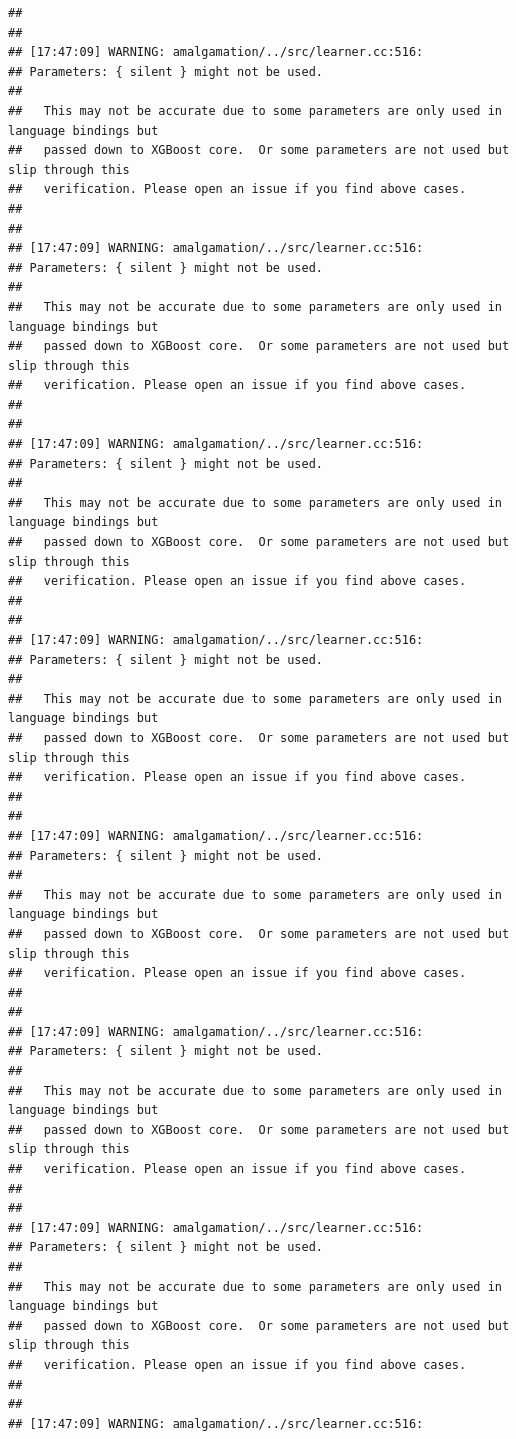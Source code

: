 \documentclass[AMS,STIX2COL]{WileyNJD-v2}\usepackage[]{graphicx}\usepackage[]{color}
\makeatletter
\newenvironment{kframe}{%
 \def\at@end@of@kframe{}%
 \ifinner\ifhmode%
  \def\at@end@of@kframe{\end{minipage}}%
  \begin{minipage}{\columnwidth}%
 \fi\fi%
 \def\FrameCommand##1{\hskip\@totalleftmargin \hskip-\fboxsep
 \colorbox{shadecolor}{##1}\hskip-\fboxsep
     \hskip-\linewidth \hskip-\@totalleftmargin \hskip\columnwidth}%
 \MakeFramed {\advance\hsize-\width
   \@totalleftmargin\z@ \linewidth\hsize
   \@setminipage}}%
 {\par\unskip\endMakeFramed%
 \at@end@of@kframe}
\newenvironment{knitrout}{}{} %
\makeatother
\begin{document}
\begin{knitrout}
\begin{kframe}
\begin{verbatim}
## 
## 
## [17:47:09] WARNING: amalgamation/../src/learner.cc:516: 
## Parameters: { silent } might not be used.
## 
##   This may not be accurate due to some parameters are only used in language bindings but
##   passed down to XGBoost core.  Or some parameters are not used but slip through this
##   verification. Please open an issue if you find above cases.
## 
## 
## [17:47:09] WARNING: amalgamation/../src/learner.cc:516: 
## Parameters: { silent } might not be used.
## 
##   This may not be accurate due to some parameters are only used in language bindings but
##   passed down to XGBoost core.  Or some parameters are not used but slip through this
##   verification. Please open an issue if you find above cases.
## 
## 
## [17:47:09] WARNING: amalgamation/../src/learner.cc:516: 
## Parameters: { silent } might not be used.
## 
##   This may not be accurate due to some parameters are only used in language bindings but
##   passed down to XGBoost core.  Or some parameters are not used but slip through this
##   verification. Please open an issue if you find above cases.
## 
## 
## [17:47:09] WARNING: amalgamation/../src/learner.cc:516: 
## Parameters: { silent } might not be used.
## 
##   This may not be accurate due to some parameters are only used in language bindings but
##   passed down to XGBoost core.  Or some parameters are not used but slip through this
##   verification. Please open an issue if you find above cases.
## 
## 
## [17:47:09] WARNING: amalgamation/../src/learner.cc:516: 
## Parameters: { silent } might not be used.
## 
##   This may not be accurate due to some parameters are only used in language bindings but
##   passed down to XGBoost core.  Or some parameters are not used but slip through this
##   verification. Please open an issue if you find above cases.
## 
## 
## [17:47:09] WARNING: amalgamation/../src/learner.cc:516: 
## Parameters: { silent } might not be used.
## 
##   This may not be accurate due to some parameters are only used in language bindings but
##   passed down to XGBoost core.  Or some parameters are not used but slip through this
##   verification. Please open an issue if you find above cases.
## 
## 
## [17:47:09] WARNING: amalgamation/../src/learner.cc:516: 
## Parameters: { silent } might not be used.
## 
##   This may not be accurate due to some parameters are only used in language bindings but
##   passed down to XGBoost core.  Or some parameters are not used but slip through this
##   verification. Please open an issue if you find above cases.
## 
## 
## [17:47:09] WARNING: amalgamation/../src/learner.cc:516: 

\end{verbatim}
\end{kframe}
\end{knitrout}
\end{document}
